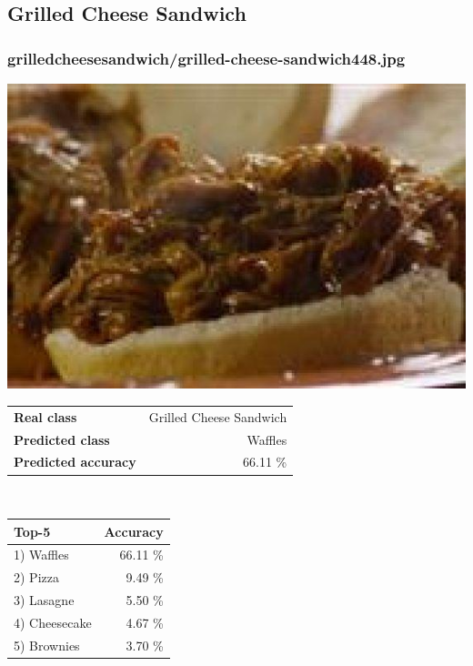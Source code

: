 \subsection{Grilled Cheese Sandwich}
    
\subsubsection{grilled\textunderscore cheese\textunderscore sandwich/grilled-cheese-sandwich448.jpg}

\begin{minipage}[t]{0.4\textwidth}
	\vspace{0pt}
	\includegraphics[width=\linewidth]{images/evaluation-images/grilled_cheese_sandwich/grilled-cheese-sandwich448.jpg}
\end{minipage}
\hfill
\begin{minipage}[t]{0.5\textwidth}
	\vspace{0pt}\raggedright
	\begin{tabularx}{\textwidth}{X r}
		\small \textbf{Real class} & \small Grilled Cheese Sandwich\\
		\small \textbf{Predicted class} & \small Waffles\\
		\small \textbf{Predicted accuracy} & \small 66.11 \%
    \end{tabularx}\\
    
    \vspace{6pt}
	\begin{tabularx}{\textwidth}{X r}
        \small \textbf{Top-5} & \small \textbf{Accuracy} \\
        \hline
		\small 1) Waffles & \small 66.11 \%\\\small 2) Pizza & \small 9.49 \%\\\small 3) Lasagne & \small 5.50 \%\\\small 4) Cheesecake & \small 4.67 \%\\\small 5) Brownies & \small 3.70 \%
    \end{tabularx}
\end{minipage}
    
